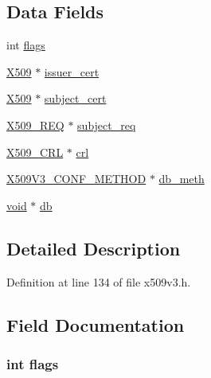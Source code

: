 \subsection*{Data Fields}
\begin{DoxyCompactItemize}
\item 
int \hyperlink{structv3__ext__ctx_ac8bf36fe0577cba66bccda3a6f7e80a4}{flags}
\item 
\hyperlink{crypto_2ossl__typ_8h_a4f666bde6518f95deb3050c54b408416}{X509} $\ast$ \hyperlink{structv3__ext__ctx_a82be44d2b12da27169816bc9f3ddc231}{issuer\+\_\+cert}
\item 
\hyperlink{crypto_2ossl__typ_8h_a4f666bde6518f95deb3050c54b408416}{X509} $\ast$ \hyperlink{structv3__ext__ctx_a8e3404d358de73079f900dc04c3d67cb}{subject\+\_\+cert}
\item 
\hyperlink{crypto_2x509_2x509_8h_afcb1c737fc5aee6c012c238794ef2d66}{X509\+\_\+\+R\+EQ} $\ast$ \hyperlink{structv3__ext__ctx_a5c1d9e02e36a130ccefe527da548a9cb}{subject\+\_\+req}
\item 
\hyperlink{crypto_2ossl__typ_8h_ac8661d2485c2c8da5fd7dd26b846f4bf}{X509\+\_\+\+C\+RL} $\ast$ \hyperlink{structv3__ext__ctx_a097ce42aa48bbc5d44148e782c3d56ae}{crl}
\item 
\hyperlink{crypto_2x509v3_2x509v3_8h_aa95cb7d1c2231f28f49bc9e7ba63e5a0}{X509\+V3\+\_\+\+C\+O\+N\+F\+\_\+\+M\+E\+T\+H\+OD} $\ast$ \hyperlink{structv3__ext__ctx_a743eafa6e1a556a23c76c4c5636c2260}{db\+\_\+meth}
\item 
\hyperlink{hw__4758__cca_8h_afad4d591c7931ff6dc5bf69c76c96aa0}{void} $\ast$ \hyperlink{structv3__ext__ctx_a28c211b805ca94c1cbe02a69b934b3af}{db}
\end{DoxyCompactItemize}


\subsection{Detailed Description}


Definition at line 134 of file x509v3.\+h.



\subsection{Field Documentation}
\subsubsection[{\texorpdfstring{flags}{flags}}]{\setlength{\rightskip}{0pt plus 5cm}int flags}\hypertarget{structv3__ext__ctx_ac8bf36fe0577cba66bccda3a6f7e80a4}{}\label{structv3__ext__ctx_ac8bf36fe0577cba66bccda3a6f7e80a4}


